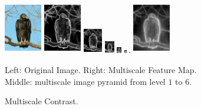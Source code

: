 \documentclass[10pt,twocolumn,letterpaper]{article}
\begin{document}
\begin{figure}[b]
\begin{center}    
\includegraphics[width=0.65in,height=0.9in]{./Figures/pyramid/5_145_145839raw.jpg} \hspace{2mm}
 \includegraphics[width=0.65in,height=0.9in]{./Figures/pyramid/5_145_145839_p0.jpg} 
 \includegraphics[width=0.325in,height=0.45in]{./Figures/pyramid/5_145_145839_p1.jpg} 
\includegraphics[width=0.1625in,height=0.225in]{./Figures/pyramid/5_145_145839_p2.jpg} 
\includegraphics[width=0.08125in,height=0.1125in]{./Figures/pyramid/5_145_145839_p3.jpg} 
 \includegraphics[width=0.040625in,height=0.0575in]{./Figures/pyramid/5_145_145839_p4.jpg} 
 \includegraphics[width=0.0203125in,height=0.02825in]{./Figures/pyramid/5_145_145839_p5.jpg} \hspace{1mm}
 \includegraphics[width=0.65in,height=0.9in]{./Figures/pyramid/5_145_145839.jpg} \\   
\caption{Multiscale Contrast.}\small{Left: Original Image. Right: Multiscale Feature Map. \\
Middle: multiscale image pyramid from level $1$ to $6$.} \label{fig:multiscale}
\end{center}
\end{figure}
\end{document}
